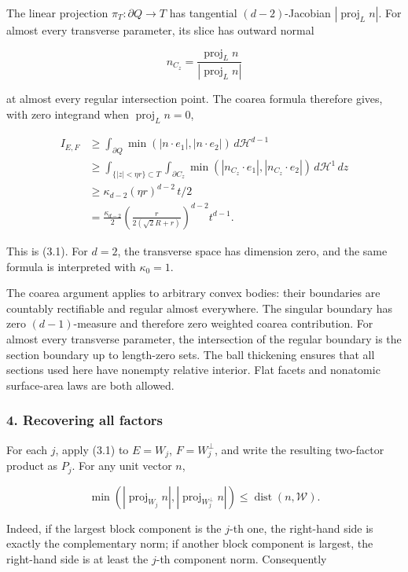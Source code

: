 \documentclass[
  11pt,
]{article}
\begin{document}
The linear projection \(\pi_T:\partial Q\to T\) has tangential
\((d-2)\)-Jacobian \(|\operatorname{proj}_L n|\). For almost every
transverse parameter, its slice has outward normal

\[
 n_{C_z}=\frac{\operatorname{proj}_L n}
                 {|\operatorname{proj}_L n|}
\]

at almost every regular intersection point. The coarea formula therefore
gives, with zero integrand when \(\operatorname{proj}_L n=0\),

\[
\begin{aligned}
I_{E,F}
&\ge\int_{\partial Q}\min(|n\cdot e_1|,|n\cdot e_2|)
                       \,d\mathcal H^{d-1}\\
&\ge\int_{\{|z|<\eta r\}\subset T}
   \int_{\partial C_z}
       \min(|n_{C_z}\cdot e_1|,|n_{C_z}\cdot e_2|)
       \,d\mathcal H^1\,dz\\
&\ge\kappa_{d-2}(\eta r)^{d-2}\,t/2\\
&=\frac{\kappa_{d-2}}2
       \left(\frac{r}{2(\sqrt2R+r)}\right)^{d-2}t^{d-1}.
\end{aligned}
\]

This is (3.1). For \(d=2\), the transverse space has dimension zero, and
the same formula is interpreted with \(\kappa_0=1\).

The coarea argument applies to arbitrary convex bodies: their boundaries
are countably rectifiable and regular almost everywhere. The singular
boundary has zero \((d-1)\)-measure and therefore zero weighted coarea
contribution. For almost every transverse parameter, the intersection of
the regular boundary is the section boundary up to length-zero sets. The
ball thickening ensures that all sections used here have nonempty
relative interior. Flat facets and nonatomic surface-area laws are both
allowed.

\subsubsection{4. Recovering all factors}\label{recovering-all-factors}

For each \(j\), apply (3.1) to \(E=W_j\), \(F=W_j^\perp\), and write the
resulting two-factor product as \(P_j\). For any unit vector \(n\),

\[
 \min(|\operatorname{proj}_{W_j}n|,
       |\operatorname{proj}_{W_j^\perp}n|)
 \le \operatorname{dist}(n,\mathcal W).
\]

Indeed, if the largest block component is the \(j\)-th one, the
right-hand side is exactly the complementary norm; if another block
component is largest, the right-hand side is at least the \(j\)-th
component norm. Consequently
\end{document}
